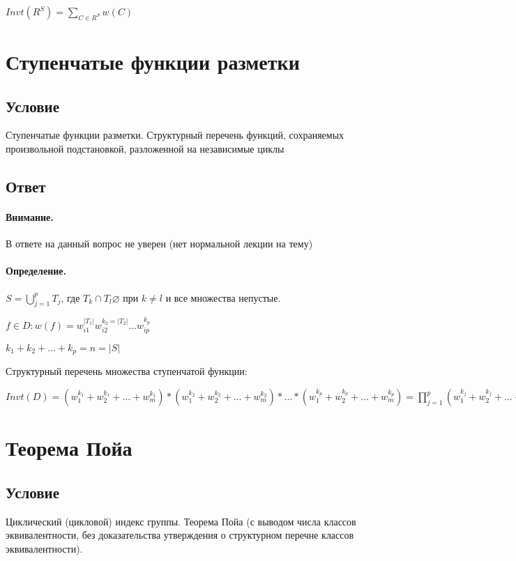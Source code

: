 \documentclass{report}
\begin{document}
$Invt(R^{S}) = \sum_{C \in R^{S}} w(C)$ 

\newpage


\section{Ступенчатые функции разметки}
\subsection{Условие}
Ступенчатые функции разметки. Структурный перечень функций, сохраняемых
произвольной подстановкой, разложенной на независимые циклы

\subsection{Ответ}

\paragraph*{Внимание.} В ответе на данный вопрос не уверен (нет нормальной лекции на тему)


\paragraph*{Определение.}
$S = \bigcup_{j=1}^{p} T_{j}$, где $T_{k} \cap T_{l} \varnothing$ при $k \neq l$ и все множества
непустые.


$f \in D: w(f) = w_{i1}^{|T_1|} w_{i2}^{k_2=|T_2|}\ldots w_{ip}^{k_{p}}$ 


$k_1+k_2+\ldots+k_{p} = n = |S|$ 

\medskip


Структурный перечень множества ступенчатой функции:


$Invt(D) = (w_1^{k_1} + w_2^{k_1} + \ldots + w_{m}^{k_1}) * (w_1^{k_2} + w_2^{k_2} + \ldots + w_{m}^{k_2})*
\ldots * (w_1^{k_{p}} + w_2^{k_{p}} + \ldots + w_{m}^{k_{p}}) = 
\prod_{j=1}^{p}(w_1^{k_{j}} + w_2^{k_{j}} + \ldots + w_{m}^{k_{j}})  $


\newpage


\section{Теорема Пойа}
\subsection{Условие}
Циклический (цикловой) индекс группы. Теорема Пойа (с выводом числа классов
эквивалентности, без доказательства утверждения о структурном перечне классов
эквивалентности).
\end{document}
